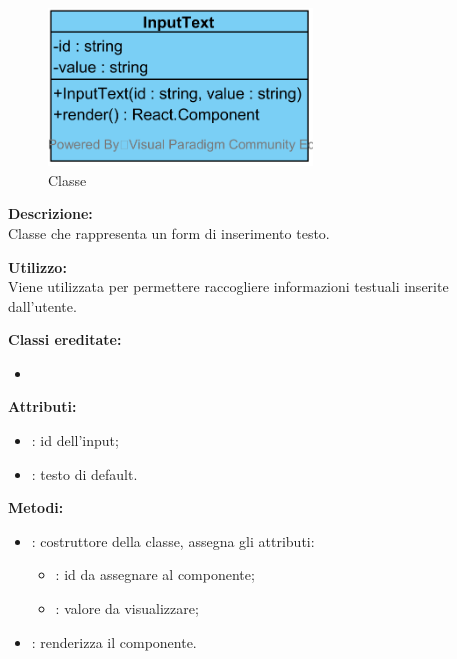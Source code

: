 \paragraph[::InputText]{\class}\mbox{}\\ \label{\class}
\begin{figure}[H]
	\centering
	\includegraphics[width=7cm]{./diagrammi/framework/view/gui/inputtext.png}
	\caption{Classe \class}
\end{figure}
\textbf{Descrizione:}\\
Classe che rappresenta un form di inserimento testo.

\textbf{Utilizzo:}\\
Viene utilizzata per permettere raccogliere informazioni testuali inserite dall'utente.

\textbf{Classi ereditate:}
\begin{itemize}
	\item {}
\end{itemize}


\textbf{Attributi:}
\begin{itemize}
	\item {}: id dell'input;
	\item {}: testo di default.
\end{itemize}

\textbf{Metodi:}
\begin{itemize}
	\item {}: costruttore della classe, assegna gli attributi:
	\begin{itemize}
		\item {}: id da assegnare al componente;
		\item {}: valore da visualizzare;
	\end{itemize}
	\item {}: renderizza il componente.
\end{itemize}

